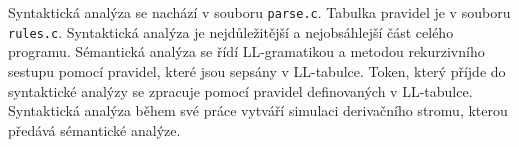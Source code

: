 \documentclass[../main.tex]{subfiles}
\begin{document}
Syntaktická analýza se nachází v souboru \texttt{parse.c}. Tabulka pravidel je v souboru \texttt{rules.c}.
Syntaktická analýza je nejdůležitější a nejobsáhlejší část celého programu. Sémantická analýza se řídí LL-gramatikou a metodou rekurzivního sestupu pomocí pravidel, které jsou sepsány v LL-tabulce. Token, který příjde do syntaktické analýzy se zpracuje pomocí pravidel definovaných v LL-tabulce.
Syntaktická analýza během své práce vytváří simulaci derivačního stromu, kterou předává sémantické analýze.
\end{document}
